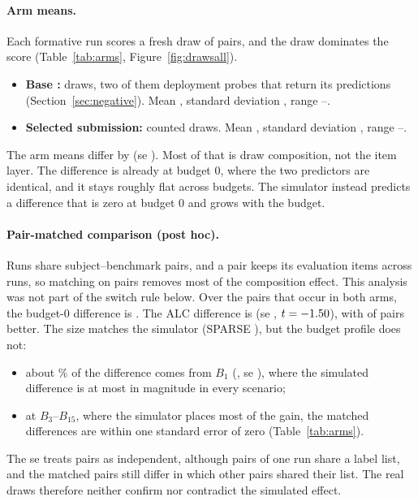 \documentclass{article}
\begin{document}
\paragraph{Arm means.} Each formative run scores a fresh draw of pairs, and the draw dominates the score (Table~\ref{tab:arms}, Figure~\ref{fig:drawsall}).
\begin{itemize}
\item \textbf{Base \SelId:} \ArBaseN{} draws, two of them deployment probes that return its predictions (Section~\ref{sec:negative}). Mean \ArBaseMean, standard deviation \ArBaseSd, range \ArBaseMin--\ArBaseMax.
\item \textbf{Selected submission:} \ArWtwoN{} counted draws\ArWtwoPending. Mean \ArWtwoMean, standard deviation \ArWtwoSd, range \ArWtwoMin--\ArWtwoMax.\InfraFootnote
\end{itemize}
The arm means differ by \ArDiffMean{} (se \ArDiffSe). Most of that is draw composition, not the item layer. The difference is already \ArDiffBZero{} at budget 0, where the two predictors are identical, and it stays roughly flat across budgets. The simulator instead predicts a difference that is zero at budget 0 and grows with the budget.

\paragraph{Pair-matched comparison (post hoc).} Runs share subject--benchmark pairs, and a pair keeps its evaluation items across runs, so matching on pairs removes most of the composition effect. This analysis was not part of the switch rule below. Over the \PmN{} pairs that occur in both arms, the budget-0 difference is \PmBZeroExact. The ALC difference is \PmMean{} (se \PmSe, $t=-1.50$), with \PmImproved{} of \PmN{} pairs better. The size matches the simulator (SPARSE \WcSparseMean), but the budget profile does not:
\begin{itemize}
\item about \PmBOneSharePct\% of the difference comes from $B_1$ (\PmBOneMean, se \PmBOneSe), where the simulated difference is at most \WcDBOneMaxAbs{} in magnitude in every scenario;
\item at $B_3$--$B_{15}$, where the simulator places most of the gain, the matched differences are within one standard error of zero (Table~\ref{tab:arms}).
\end{itemize}
The se treats pairs as independent, although pairs of one run share a label list, and the matched pairs still differ in which other pairs shared their list. The real draws therefore neither confirm nor contradict the simulated effect.
\end{document}
